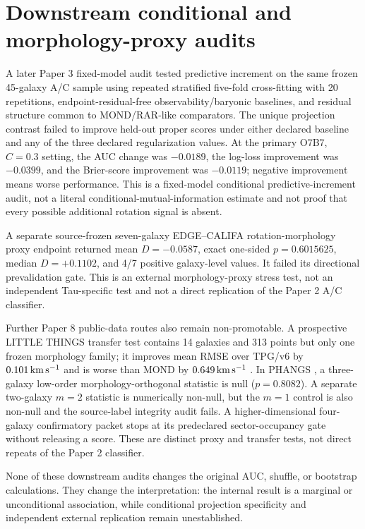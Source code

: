 \documentclass[11pt]{article}
\begin{document}
\section{Downstream conditional and morphology-proxy audits}

A later Paper 3 fixed-model audit tested predictive increment on the same frozen 45-galaxy A/C sample using repeated stratified five-fold cross-fitting with 20 repetitions, endpoint-residual-free observability/baryonic baselines, and residual structure common to MOND/RAR-like comparators. The unique projection contrast failed to improve held-out proper scores under either declared baseline and any of the three declared regularization values. At the primary O7B7, $C=0.3$ setting, the AUC change was $-0.0189$, the log-loss improvement was $-0.0399$, and the Brier-score improvement was $-0.0119$; negative improvement means worse performance. This is a fixed-model conditional predictive-increment audit, not a literal conditional-mutual-information estimate and not proof that every possible additional rotation signal is absent.

A separate source-frozen seven-galaxy EDGE--CALIFA rotation-morphology proxy endpoint returned mean $D = -0.0587$, exact one-sided $p = 0.6015625$, median $D = +0.1102$, and 4/7 positive galaxy-level values. It failed its directional prevalidation gate. This is an external morphology-proxy stress test, not an independent Tau-specific test and not a direct replication of the Paper 2 A/C classifier.

Further Paper 8 public-data routes also remain non-promotable. A prospective LITTLE THINGS transfer test contains 14 galaxies and 313 points but only one frozen morphology family; it improves mean RMSE over TPG/v6 by $0.101\,{\rm km\,s^{-1}}$ and is worse than MOND by $0.649\,{\rm km\,s^{-1}}$ \cite{Oh2015LITTLETHINGS}. In PHANGS \cite{Lang2020PHANGSKinematics,Emsellem2022PHANGSMUSE}, a three-galaxy low-order morphology-orthogonal statistic is null ($p=0.8082$). A separate two-galaxy $m=2$ statistic is numerically non-null, but the $m=1$ control is also non-null and the source-label integrity audit fails. A higher-dimensional four-galaxy confirmatory packet stops at its predeclared sector-occupancy gate without releasing a score. These are distinct proxy and transfer tests, not direct repeats of the Paper 2 classifier.

None of these downstream audits changes the original AUC, shuffle, or bootstrap calculations. They change the interpretation: the internal result is a marginal or unconditional association, while conditional projection specificity and independent external replication remain unestablished.
\end{document}
